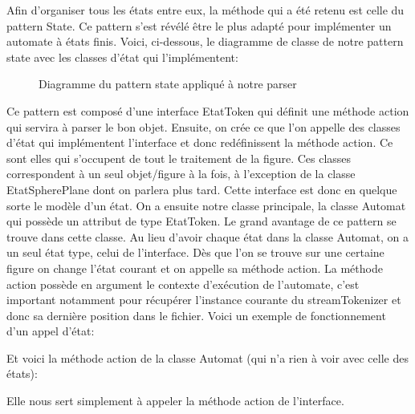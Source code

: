 \documentclass[../../Rapport RayTracer]{subfiles}
\begin{document}
Afin d'organiser tous les états entre eux, la méthode qui a été retenu est celle du pattern State. Ce pattern s'est révélé être le plus adapté pour implémenter un automate à états finis. Voici, ci-dessous, le diagramme de classe de notre pattern state avec les classes d'état qui l'implémentent:

\begin{figure}[h!]
	
	\caption{Diagramme du pattern state appliqué à notre parser}
	\label{diagrammePatternState}
\end{figure}
\FloatBarrier

Ce pattern est composé d'une interface EtatToken qui définit une méthode action qui servira à parser le bon objet. Ensuite, on crée ce que l'on appelle des classes d'état qui implémentent l'interface et donc redéfinissent la méthode action. Ce sont elles qui s'occupent de tout le traitement de la figure. Ces classes correspondent à un seul objet/figure à la fois, à l'exception de la classe EtatSpherePlane dont on parlera plus tard. Cette interface est donc en quelque sorte le modèle d'un état.
On a ensuite notre classe principale, la classe Automat qui possède un attribut de type EtatToken. Le grand avantage de ce pattern se trouve dans cette classe. Au lieu d'avoir chaque état dans la classe Automat, on a un seul état type, celui de l'interface. Dès que l'on se trouve sur une certaine figure on change l'état courant et on appelle sa méthode action. La méthode action possède en argument le contexte d'exécution de l'automate, c'est important notamment pour récupérer l'instance courante du streamTokenizer et donc sa dernière position dans le fichier. Voici un exemple de fonctionnement d'un appel d'état:

 

Et voici la méthode action de la classe Automat (qui n'a rien à voir avec celle des états):

 
 
Elle nous sert simplement à appeler la méthode action de l'interface.
\end{document}
